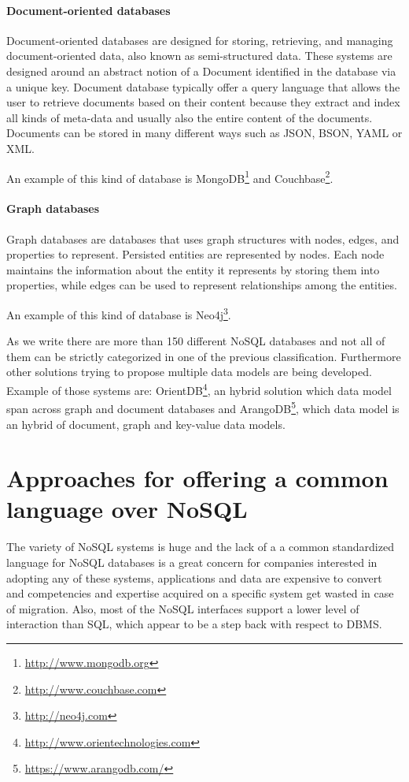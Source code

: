 \paragraph{Document-oriented databases}
Document-oriented databases are designed for storing, retrieving, and managing document-oriented data, also known as semi-structured data. 
These systems are designed around an abstract notion of a Document identified in the database via a unique key. 
Document database typically offer a query language that allows the user to retrieve documents based on their content because they extract and index all kinds of meta-data and usually also the entire content of the documents. 
Documents can be stored in many different ways such as JSON, BSON, YAML or XML.

\noindent An example of this kind of database is MongoDB\footnote{\url{http://www.mongodb.org}} and Couchbase\footnote{\url{http://www.couchbase.com}}.

\paragraph{Graph databases} 
Graph databases are databases that uses graph structures with nodes, edges, and properties to represent.
Persisted entities are represented by nodes. Each node maintains the information about the entity it represents by storing them into properties, while edges can be used to represent relationships among the entities.

\noindent An example of this kind of database is Neo4j\footnote{\url{http://neo4j.com}}.

\newparagraph As we write there are more than 150 \cite{online:nosql-database.org} different NoSQL databases and not all of them can be strictly categorized in one of the previous classification. Furthermore other solutions trying to propose multiple data models are being developed. Example of those systems are: OrientDB\footnote{\url{http://www.orientechnologies.com}}, an hybrid solution which data model span across graph and document databases and ArangoDB\footnote{\url{https://www.arangodb.com/}}, which data model is an hybrid of document, graph and key-value data models.

\section{Approaches for offering a common language over NoSQL}
\label{sec:common-language}
The variety of NoSQL systems is huge and the lack of a a common standardized language for NoSQL databases is a great concern for companies interested in adopting any of these systems, applications and data are expensive to convert and competencies and expertise acquired on a specific system get wasted in case of migration. 
Also, most of the NoSQL interfaces support a lower level of interaction than SQL, which appear to be a step back with respect to DBMS.

